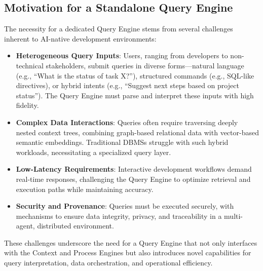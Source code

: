 \documentclass[11pt]{article}
\begin{document}
\subsection{Motivation for a Standalone Query Engine}
The necessity for a dedicated Query Engine stems from several challenges inherent to AI-native development environments:
\begin{itemize}
    \item \textbf{Heterogeneous Query Inputs}: Users, ranging from developers to non-technical stakeholders, submit queries in diverse forms—natural language (e.g., “What is the status of task X?”), structured commands (e.g., SQL-like directives), or hybrid intents (e.g., “Suggest next steps based on project status”). The Query Engine must parse and interpret these inputs with high fidelity.
    \item \textbf{Complex Data Interactions}: Queries often require traversing deeply nested context trees, combining graph-based relational data with vector-based semantic embeddings. Traditional DBMSs struggle with such hybrid workloads, necessitating a specialized query layer.
    \item \textbf{Low-Latency Requirements}: Interactive development workflows demand real-time responses, challenging the Query Engine to optimize retrieval and execution paths while maintaining accuracy.
    \item \textbf{Security and Provenance}: Queries must be executed securely, with mechanisms to ensure data integrity, privacy, and traceability in a multi-agent, distributed environment.
\end{itemize}
These challenges underscore the need for a Query Engine that not only interfaces with the Context and Process Engines but also introduces novel capabilities for query interpretation, data orchestration, and operational efficiency.
\end{document}
